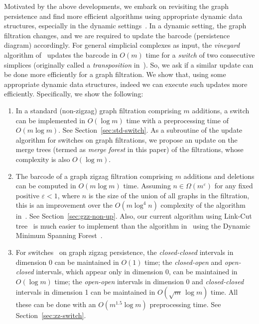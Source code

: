 \documentclass[letterpaper,11pt]{article}
\theoremstyle{mythmstyle}
\theoremstyle{mydefstyle}
\theoremstyle{plain}
\theoremstyle{definition}
\newcommand{\<}[1]{\langle #1\rangle}
\theoremstyle{definition}
\begin{document}
Motivated by the above developments, we embark on
revisiting the graph persistence and find more efficient algorithms using appropriate
dynamic data structures, especially in the dynamic settings~\cite{cohen2006vines,dey2021updating}.
In a dynamic setting, the graph filtration changes, and we are
required to update the barcode (persistence diagram) accordingly. For general simplicial complexes as input, 
the \emph{vineyard} algorithm of~\cite{cohen2006vines} updates the barcode in $O(m)$ time
for a \emph{switch} of two  
consecutive simplices (originally called a \emph{transposition} in~\cite{cohen2006vines}). 
So, we ask
if a similar update can be done more efficiently for a graph filtration. 
We show that, using some appropriate
dynamic data structures, indeed we can execute such updates
more efficiently. Specifically, we show the following:
\begin{enumerate}
    \item In a standard (non-zigzag) graph filtration comprising $m$ additions,
    a switch can be implemented in $O(\log m)$ time with a preprocessing
    time of $O(m\log m)$. See Section~\ref{sec:std-switch}.
    As a subroutine of the update algorithm for switches on graph filtrations,
    we propose an update on the merge trees (termed as \emph{merge forest} in this paper)
    of the filtrations, 
    whose complexity is also $O(\log m)$.
    \item The barcode of a graph zigzag filtration comprising
    $m$ additions and deletions can be computed in $O(m\log m)$ time.
    Assuming $n\in \Omega(m^\varepsilon)$ for any fixed positive $\varepsilon<1$, where $n$ is the size of the union of all graphs in the filtration,
    this is an improvement over
    the $O(m\log^4 n)$ complexity of the algorithm in~\cite{dey2021computing}.
    See Section~\ref{sec:gzz-non-up}.
    Also, our current algorithm using Link-Cut tree~\cite{sleator1981data}
    is much easier to implement than the algorithm in~\cite{dey2021computing} using the Dynamic 
    Minimum Spanning Forest~\cite{holm2001poly}.
    \item 
    For switches~\cite{dey2021updating} on graph zigzag persistence, 
    the \emph{closed-closed} intervals in dimension 0
    can be maintained in $O(1)$ time;
    the \textit{closed-open} and \textit{open-closed} intervals, which appear only in dimension $0$,
    can be maintained in $O(\log m)$ time;
    the \emph{open-open} intervals in dimension 0 and 
    \emph{closed-closed} intervals in dimension 1
    can be maintained in $O(\sqrt{m}\,\log m)$ time. 
    All these can be done with an $O(m^{1.5}\log m)$ preprocessing
    time.
    See Section~\ref{sec:zz-switch}.
\end{enumerate}
\end{document}
